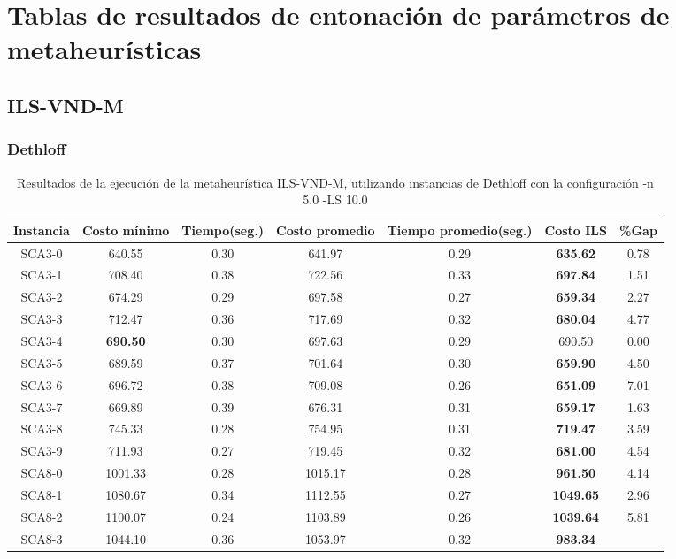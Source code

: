 \chapter{Tablas de resultados de entonación de parámetros de metaheurísticas}\label{chap:apendiceC}

\section{ILS-VND-M}

\subsection{Dethloff}

\begin{table}[h]
\caption{Resultados de la ejecución de la metaheurística ILS-VND-M, utilizando instancias de Dethloff con la configuración -n 5.0 -LS 10.0}
\centering
\small
\begin{tabular}{c c c c c c c}
\hline\hline
Instancia & Costo mínimo & Tiempo(seg.) & Costo promedio & Tiempo promedio(seg.) & Costo ILS & \%Gap \\ [0.5ex]
\hline
SCA3-0 & 640.55 & 0.30 & 
641.97 & 0.29 & \bf{635.62} & 
0.78\\SCA3-1 & 708.40 & 0.38 & 
722.56 & 0.33 & \bf{697.84} & 
1.51\\SCA3-2 & 674.29 & 0.29 & 
697.58 & 0.27 & \bf{659.34} & 
2.27\\SCA3-3 & 712.47 & 0.36 & 
717.69 & 0.32 & \bf{680.04} & 
4.77\\SCA3-4 & \bf{690.50} & 0.30 & 
697.63 & 0.29 & 690.50 & 0.00\\
SCA3-5 & 689.59 & 0.37 & 
701.64 & 0.30 & \bf{659.90} & 
4.50\\SCA3-6 & 696.72 & 0.38 & 
709.08 & 0.26 & \bf{651.09} & 
7.01\\SCA3-7 & 669.89 & 0.39 & 
676.31 & 0.31 & \bf{659.17} & 
1.63\\SCA3-8 & 745.33 & 0.28 & 
754.95 & 0.31 & \bf{719.47} & 
3.59\\SCA3-9 & 711.93 & 0.27 & 
719.45 & 0.32 & \bf{681.00} & 
4.54\\SCA8-0 & 1001.33 & 0.28 & 
1015.17 & 0.28 & \bf{961.50} & 
4.14\\SCA8-1 & 1080.67 & 0.34 & 
1112.55 & 0.27 & \bf{1049.65} & 
2.96\\SCA8-2 & 1100.07 & 0.24 & 
1103.89 & 0.26 & \bf{1039.64} & 
5.81\\SCA8-3 & 1044.10 & 0.36 & 
1053.97 & 0.32 & \bf{983.34} & 

\end{tabular}
\end{table}
